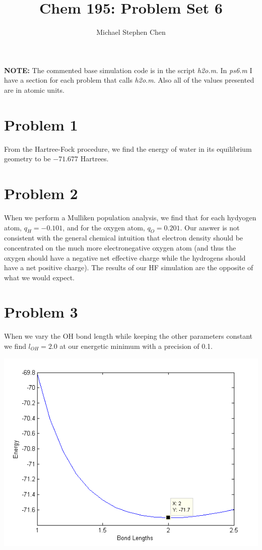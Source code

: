 \documentclass{article}
\title{Chem 195: Problem Set 6}
\author{Michael Stephen Chen}
\begin{document}
\maketitle
\pagebreak

\textbf{NOTE:} The commented base simulation code is in the script \textit{h2o.m}. In \textit{ps6.m} I have a section for each problem that calls \textit{h2o.m}. Also all of the values presented are in atomic units.

\section*{Problem 1}
From the Hartree-Fock procedure, we find the energy of water in its equilibrium geometry to be $-71.677$ Hartrees.


\section*{Problem 2}
When we perform a Mulliken population analysis, we find that for each hydyogen atom, $q_H = -0.101$, and for the oxygen atom, $q_O = 0.201$. Our answer is not consistent with the general chemical intuition that electron density should be concentrated on the much more electronegative oxygen atom (and thus the oxygen should have a negative net effective charge while the hydrogens should have a net positive charge). The results of our HF simulation are the opposite of what we would expect.

\section*{Problem 3}
When we vary the OH bond length while keeping the other parameters constant we find $l_{OH}=2.0$ at our energetic minimum with a precision of 0.1.
\begin{center}
  \includegraphics[scale=0.5]{prob3.png}
\end{center}
\end{document}
